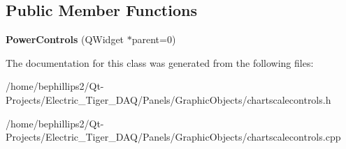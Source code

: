 \subsection*{Public Member Functions}
\begin{DoxyCompactItemize}
\item 
{\bfseries Power\+Controls} (Q\+Widget $\ast$parent=0)\hypertarget{class_power_controls_a73bb29ad05d93d0d945596b02b3a058a}{}\label{class_power_controls_a73bb29ad05d93d0d945596b02b3a058a}

\end{DoxyCompactItemize}


The documentation for this class was generated from the following files\+:\begin{DoxyCompactItemize}
\item 
/home/bephillips2/\+Qt-\/\+Projects/\+Electric\+\_\+\+Tiger\+\_\+\+D\+A\+Q/\+Panels/\+Graphic\+Objects/chartscalecontrols.\+h\item 
/home/bephillips2/\+Qt-\/\+Projects/\+Electric\+\_\+\+Tiger\+\_\+\+D\+A\+Q/\+Panels/\+Graphic\+Objects/chartscalecontrols.\+cpp\end{DoxyCompactItemize}
